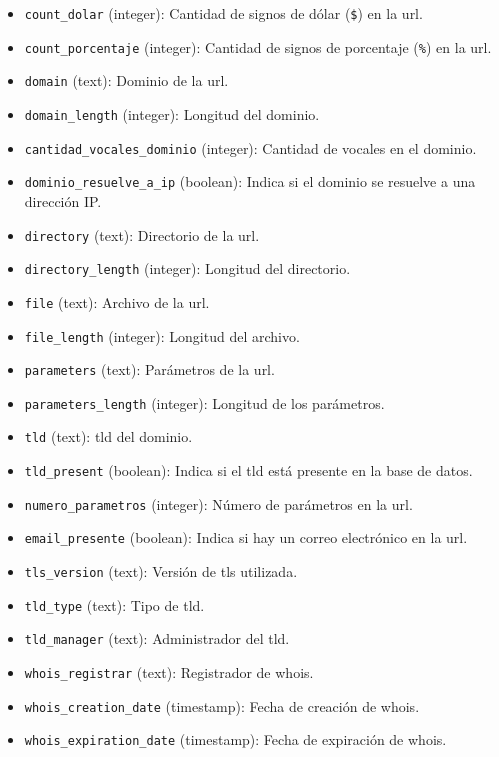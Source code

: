 \begin{itemize}
    \item \texttt{count\_dolar} (integer): Cantidad de signos de dólar (\texttt{\$}) en la \gls{url}.
    \item \texttt{count\_porcentaje} (integer): Cantidad de signos de porcentaje (\texttt{\%}) en la \gls{url}.
    \item \texttt{domain} (text): Dominio de la \gls{url}.
    \item \texttt{domain\_length} (integer): Longitud del dominio.
    \item \texttt{cantidad\_vocales\_dominio} (integer): Cantidad de vocales en el dominio.
    \item \texttt{dominio\_resuelve\_a\_ip} (boolean): Indica si el dominio se resuelve a una dirección IP.
    \item \texttt{directory} (text): Directorio de la \gls{url}.
    \item \texttt{directory\_length} (integer): Longitud del directorio.
    \item \texttt{file} (text): Archivo de la \gls{url}.
    \item \texttt{file\_length} (integer): Longitud del archivo.
    \item \texttt{parameters} (text): Parámetros de la \gls{url}.
    \item \texttt{parameters\_length} (integer): Longitud de los parámetros.
    \item \texttt{tld} (text): \gls{tld} del dominio.
    \item \texttt{tld\_present} (boolean): Indica si el \gls{tld} está presente en la base de datos.
    \item \texttt{numero\_parametros} (integer): Número de parámetros en la \gls{url}.
    \item \texttt{email\_presente} (boolean): Indica si hay un correo electrónico en la \gls{url}.
    \item \texttt{tls\_version} (text): Versión de \gls{tls} utilizada.
    \item \texttt{tld\_type} (text): Tipo de \gls{tld}.
    \item \texttt{tld\_manager} (text): Administrador del \gls{tld}.
    \item \texttt{whois\_registrar} (text): Registrador de \gls{whois}.
    \item \texttt{whois\_creation\_date} (timestamp): Fecha de creación de \gls{whois}.
    \item \texttt{whois\_expiration\_date} (timestamp): Fecha de expiración de \gls{whois}.

\end{itemize}
